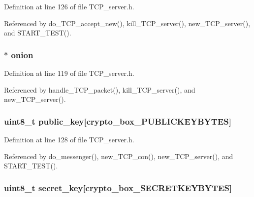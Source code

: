 Definition at line 126 of file T\+C\+P\+\_\+server.\+h.



Referenced by do\+\_\+\+T\+C\+P\+\_\+accept\+\_\+new(), kill\+\_\+\+T\+C\+P\+\_\+server(), new\+\_\+\+T\+C\+P\+\_\+server(), and S\+T\+A\+R\+T\+\_\+\+T\+E\+S\+T().

\hypertarget{struct_t_c_p___server_a66fb4bf67c711a5ed3e7bbecec7fde30}{
\subsubsection[{onion}]{$\ast$ onion}}\label{struct_t_c_p___server_a66fb4bf67c711a5ed3e7bbecec7fde30}


Definition at line 119 of file T\+C\+P\+\_\+server.\+h.



Referenced by handle\+\_\+\+T\+C\+P\+\_\+packet(), kill\+\_\+\+T\+C\+P\+\_\+server(), and new\+\_\+\+T\+C\+P\+\_\+server().

\hypertarget{struct_t_c_p___server_aaa806bb1136fb3d4b5d8d8970b596ff7}{
\subsubsection[{public\+\_\+key}]{\setlength{\rightskip}{0pt plus 5cm}uint8\+\_\+t public\+\_\+key\mbox{[}crypto\+\_\+box\+\_\+\+P\+U\+B\+L\+I\+C\+K\+E\+Y\+B\+Y\+T\+E\+S\mbox{]}}}\label{struct_t_c_p___server_aaa806bb1136fb3d4b5d8d8970b596ff7}


Definition at line 128 of file T\+C\+P\+\_\+server.\+h.



Referenced by do\+\_\+messenger(), new\+\_\+\+T\+C\+P\+\_\+con(), new\+\_\+\+T\+C\+P\+\_\+server(), and S\+T\+A\+R\+T\+\_\+\+T\+E\+S\+T().

\hypertarget{struct_t_c_p___server_a41928223d6ad8bd41837f371deef62ae}{
\subsubsection[{secret\+\_\+key}]{\setlength{\rightskip}{0pt plus 5cm}uint8\+\_\+t secret\+\_\+key\mbox{[}crypto\+\_\+box\+\_\+\+S\+E\+C\+R\+E\+T\+K\+E\+Y\+B\+Y\+T\+E\+S\mbox{]}}}\label{struct_t_c_p___server_a41928223d6ad8bd41837f371deef62ae}



